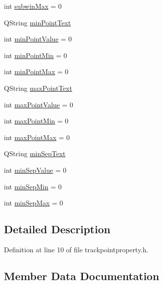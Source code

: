 \begin{DoxyCompactItemize}
\item 
int \mbox{\hyperlink{struct_track_point_property_a420b24aa71b3809f1d61b869a7fb918b}{subwin\+Max}} = 0
\item 
Q\+String \mbox{\hyperlink{struct_track_point_property_a9719c0c3d3436b11c8208300143cbc80}{min\+Point\+Text}}
\item 
int \mbox{\hyperlink{struct_track_point_property_a7f1e842f8d338d61c7818bb71cbab352}{min\+Point\+Value}} = 0
\item 
int \mbox{\hyperlink{struct_track_point_property_a2f6de2c3f4024ea18f708fe82f873937}{min\+Point\+Min}} = 0
\item 
int \mbox{\hyperlink{struct_track_point_property_af76285897d78d932390a37eb11cc47f2}{min\+Point\+Max}} = 0
\item 
Q\+String \mbox{\hyperlink{struct_track_point_property_a8b8f1cded2ae7869d010e2d37c3292b8}{max\+Point\+Text}}
\item 
int \mbox{\hyperlink{struct_track_point_property_a8a812f0a78bb80e9ef10e343e602c2bc}{max\+Point\+Value}} = 0
\item 
int \mbox{\hyperlink{struct_track_point_property_ad2cc11151970cacb0f01f0dd2c39dcd4}{max\+Point\+Min}} = 0
\item 
int \mbox{\hyperlink{struct_track_point_property_adf5aa732a275211bda36679366f83e0e}{max\+Point\+Max}} = 0
\item 
Q\+String \mbox{\hyperlink{struct_track_point_property_aa1cab6044386d7b32f1369a72a608a4b}{min\+Sep\+Text}}
\item 
int \mbox{\hyperlink{struct_track_point_property_a5d76b057232afbf3033e3f8b3a05b424}{min\+Sep\+Value}} = 0
\item 
int \mbox{\hyperlink{struct_track_point_property_a76a09baff03c25c8b98644a04b622728}{min\+Sep\+Min}} = 0
\item 
int \mbox{\hyperlink{struct_track_point_property_a0ecb42a8c0289b34a039f647d52c0ead}{min\+Sep\+Max}} = 0
\end{DoxyCompactItemize}


\subsection{Detailed Description}


Definition at line 10 of file trackpointproperty.\+h.



\subsection{Member Data Documentation}
\mbox{\label{struct_track_point_property_a2054356ddad1cdc0fed5b0954bea0fec}} 
